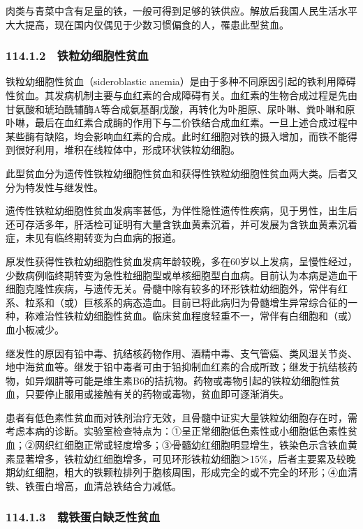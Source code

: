肉类与青菜中含有足量的铁，一般可得到足够的铁供应。解放后我国人民生活水平大大提高，现在国内仅偶见于少数习惯偏食的人，罹患此型贫血。

\subsubsection{114.1.2　铁粒幼细胞性贫血}

铁粒幼细胞性贫血（sideroblastic
anemia）是由于多种不同原因引起的铁利用障碍性贫血。其发病机制主要与血红素的合成障碍有关。血红素的生物合成过程是先由甘氨酸和琥珀酰辅酶A等合成氨基酮戊酸，再转化为卟胆原、尿卟啉、粪卟啉和原卟啉，最后在血红素合成酶的作用下与二价铁结合成血红素。一旦上述合成过程中某些酶有缺陷，均会影响血红素的合成。此时红细胞对铁的摄入增加，而铁不能得到很好利用，堆积在线粒体中，形成环状铁粒幼细胞。

此型贫血分为遗传性铁粒幼细胞性贫血和获得性铁粒幼细胞性贫血两大类。后者又分为特发性与继发性。

遗传性铁粒幼细胞性贫血发病率甚低，为伴性隐性遗传性疾病，见于男性，出生后还可存活多年，肝活检可证明有大量含铁血黄素沉着，并可发展为含铁血黄素沉着症，未见有临终期转变为白血病的报道。

原发性获得性铁粒幼细胞性贫血发病年龄较晚，多在60岁以上发病，呈慢性经过，少数病例临终期转变为急性粒细胞型或单核细胞型白血病。目前认为本病是造血干细胞克隆性疾病，与遗传无关。骨髓中除有较多的环形铁粒幼细胞外，常伴有红系、粒系和（或）巨核系的病态造血。目前已将此病归为骨髓增生异常综合征的一种，称难治性铁粒幼细胞性贫血。临床贫血程度轻重不一，常伴有白细胞和（或）血小板减少。

继发性的原因有铅中毒、抗结核药物作用、酒精中毒、支气管癌、类风湿关节炎、地中海贫血等。继发于铅中毒者可由于铅抑制血红素的合成所致；继发于抗结核药物，如异烟肼等可能是维生素B6的拮抗物。药物或毒物引起的铁粒幼细胞性贫血，只要停止服用或接触有关的药物或毒物，贫血即可逐渐消失。

患者有低色素性贫血而对铁剂治疗无效，且骨髓中证实大量铁粒幼细胞存在时，需考虑本病的诊断。实验室检查特点为：①呈正常细胞低色素性或小细胞低色素性贫血；②网织红细胞正常或轻度增多；③骨髓幼红细胞明显增生，铁染色示含铁血黄素显著增多，铁粒幼红细胞增多，可见环形铁粒幼细胞＞15\%，后者主要累及较晚期幼红细胞，粗大的铁颗粒排列于胞核周围，形成完全的或不完全的环形；④血清铁、铁蛋白增高，血清总铁结合力减低。

\subsubsection{114.1.3　载铁蛋白缺乏性贫血}


